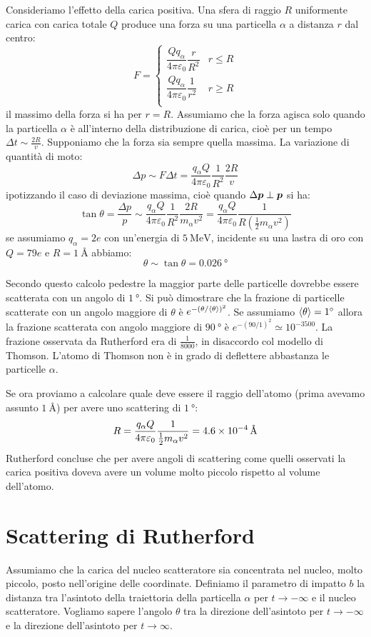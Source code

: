 Consideriamo l'effetto della carica positiva. Una sfera di raggio $R$ uniformente carica con carica totale $Q$ produce una forza su una particella $\alpha$ a distanza $r$ dal centro:
\begin{equation}
	F=\left\{\begin{array}{ll}
		\dfrac{Qq_\alpha}{4\pi\varepsilon_0}\dfrac{r}{R^2} & r\leq R \\
		\dfrac{Qq_\alpha}{4\pi\varepsilon_0}\dfrac{1}{r^2} & r\geq R \\
	\end{array}\right.
\end{equation}
il massimo della forza si ha per $r=R$. Assumiamo che la forza agisca solo quando la particella $\alpha$ è all'interno della distribuzione di carica, cioè per un tempo $\Delta t\sim\frac{2R}{v}$. Supponiamo che la forza sia sempre quella massima. La variazione di quantità di moto:
\[
	\Delta p\sim F\Delta t=\frac{q_\alpha Q}{4\pi\varepsilon_0}\frac{1}{R^2}\frac{2R}{v}
\]
ipotizzando il caso di deviazione massima, cioè quando $\Delta\boldsymbol{p}\perp\boldsymbol{p}$ si ha:
\[
	\tan\theta=\frac{\Delta p}{p}\sim\frac{q_\alpha Q}{4\pi\varepsilon_0}\frac{1}{R^2}\frac{2R}{m_\alpha v^2}=\frac{q_\alpha Q}{4\pi\varepsilon_0}\frac{1}{R\left(\frac{1}{2}m_\alpha v^2\right)}
\]
se assumiamo $q_\alpha=2e$ con un'energia di $\SI{5}{\mega\electronvolt}$, incidente su una lastra di oro con $Q=79e$ e $R=\SI{1}{\angstrom}$ abbiamo:
\[
	\theta\sim\tan\theta=\SI{0.026}{\degree}
\]

Secondo questo calcolo pedestre la maggior parte delle particelle dovrebbe essere scatterata con un angolo di $\SI{1}{\degree}$. Si può dimostrare che la frazione di particelle scatterate con un angolo maggiore di $\theta$ è $e^{-(\theta/\left<\theta\right>)^2}$. Se assumiamo $\left<\theta\right>=\SI{1}{\degree}$ allora la frazione scatterata con angolo maggiore di $\SI{90}{\degree}$ è $e^{-(90/1)^2}\simeq 10^{-3500}$. La frazione osservata da Rutherford era di $\frac{1}{8000}$, in disaccordo col modello di Thomson. L'atomo di Thomson non è in grado di deflettere abbastanza le particelle $\alpha$.

Se ora proviamo a calcolare quale deve essere il raggio dell'atomo (prima avevamo assunto $\SI{1}{\angstrom}$) per avere uno scattering di $\SI{1}{\degree}$:
\[
	R=\frac{q_\alpha Q}{4\pi\varepsilon_0}\frac{1}{\frac{1}{2}m_\alpha v^2}=\SI{4.6E-4}{\angstrom}
\]
Rutherford concluse che per avere angoli di scattering come quelli osservati la carica positiva doveva avere un volume molto piccolo rispetto al volume dell'atomo.
\section{Scattering di Rutherford}
Assumiamo che la carica del nucleo scatteratore sia concentrata nel nucleo, molto piccolo, posto nell'origine delle coordinate. Definiamo il parametro di impatto $b$ la distanza tra l'asintoto della traiettoria della particella $\alpha$ per $t\to-\infty$ e il nucleo scatteratore. Vogliamo sapere l'angolo $\theta$ tra la direzione dell'asintoto per $t\to-\infty$ e la direzione dell'asintoto per $t\to\infty$.

